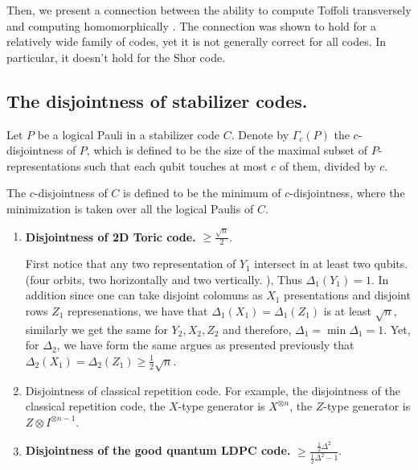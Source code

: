\documentclass[manuscript,screen,review]{acmart}
\begin{document}
{Then, we present a connection between the ability to compute Toffoli transversely and computing homomorphically \cite{CITE}. The connection was shown to hold for a relatively wide family of codes, yet it is not generally correct for all codes. In particular, it doesn't hold for the Shor code.
  \subsection{The disjointness of stabilizer codes.} 

   
\newcommand{\Disc}{ \frac{ \frac{1}{2} \Delta^{2} }{\frac{1}{2} \Delta^{2} - 1  } } 

\begin{definition}
Let $P$ be a logical Pauli in a stabilizer code $C$. Denote by $\Gamma_{c}(P)$ the $c$-disjointness of $P$, which is defined to be the size of the maximal subset of $P$-representations such that each qubit touches at most $c$ of them, divided by $c$. 


The $c$-disjointness of $C$ is defined to be the minimum of $c$-disjointness, where the minimization is taken over all the logical Paulis of $C$.
\end{definition}


\begin{enumerate}
  \item \textbf{Disjointness of 2D Toric code.} $\ge \frac{\sqrt{n}}{2}$. 

    First notice that any two representation of $Y_{1}$ intersect in at least two qubits. (four orbits, two horizontally and two vertically. ), Thus $\Delta_{1}\left( Y_{1} \right) = 1$. In addition since one can take disjoint colomuns as $X_{1}$ presentations and disjoint rows $Z_{1}$ represenations, we have that $\Delta_{1}(X_1) = \Delta_{1}(Z_1)$ is at least $\sqrt{n}$, similarly we get the same for $Y_{2},X_{2},Z_{2}$ and therefore, $\Delta_{1} = \min\Delta_{1} = 1$. 
    Yet, for $\Delta_{2}$, we have form the same argues as presented previously that $\Delta_{2}(X_{1}) = \Delta_{2}(Z_{1}) \ge \frac{1}{2}\sqrt{n}$.  
  \item Disjointness of classical repetition code. 
    For example, the disjointness of the classical repetition  code, the $X$-type generator is $X^{\otimes n}$, the $Z$-type generator is $Z \otimes I^{\otimes n-1}$. 
  \item \textbf{Disjointness of the good quantum LDPC code.} $ \ge \Disc$. 


\end{enumerate}}
\end{document}
